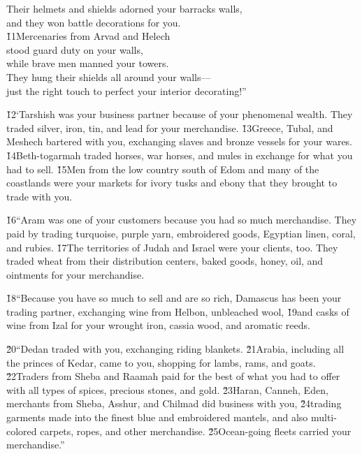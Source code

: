 \begin{poetry}
\poeml Their helmets and shields adorned your barracks walls, \\
\poemll    and they won battle decorations for you. \\
\poeml \v{11}Mercenaries from Arvad and Helech \\
\poemll    stood guard duty on your walls, \\
\poemlll       while brave men manned your towers. \\
\poeml They hung their shields all around your walls--- \\
\poemll    just the right touch to perfect your interior decorating!''
\end{poetry}

\v{12}`Tarshish was your business partner because of your phenomenal wealth. They traded silver, iron, tin, and lead for your merchandise. \v{13}Greece, Tubal, and Meshech bartered with you, exchanging slaves and bronze vessels for your wares. \v{14}Beth-togarmah traded horses, war horses, and mules in exchange for what you had to sell. \v{15}Men from the low country south of Edom and many of the coastlands were your markets for ivory tusks and ebony that they brought to trade with you.

\v{16}``Aram was one of your customers because you had so much merchandise. They paid by trading turquoise, purple yarn, embroidered goods, Egyptian linen, coral, and rubies. \v{17}The territories of Judah and Israel were your clients, too. They traded wheat from their distribution centers, baked goods, honey, oil, and ointments for your merchandise.

\v{18}``Because you have so much to sell and are so rich, Damascus has been your trading partner, exchanging wine from Helbon, unbleached wool, \v{19}and casks of wine from Izal for your wrought iron, cassia wood, and aromatic reeds.

\v{20}``Dedan traded with you, exchanging riding blankets. \v{21}Arabia, including all the princes of Kedar, came to you, shopping for lambs, rams, and goats. \v{22}Traders from Sheba and Raamah paid for the best of what you had to offer with all types of spices, precious stones, and gold. \v{23}Haran, Canneh, Eden, merchants from Sheba, Asshur, and Chilmad did business with you, \v{24}trading garments made into the finest blue and embroidered mantels, and also multi-colored carpets, ropes, and other merchandise. \v{25}Ocean-going fleets carried your merchandise.''

